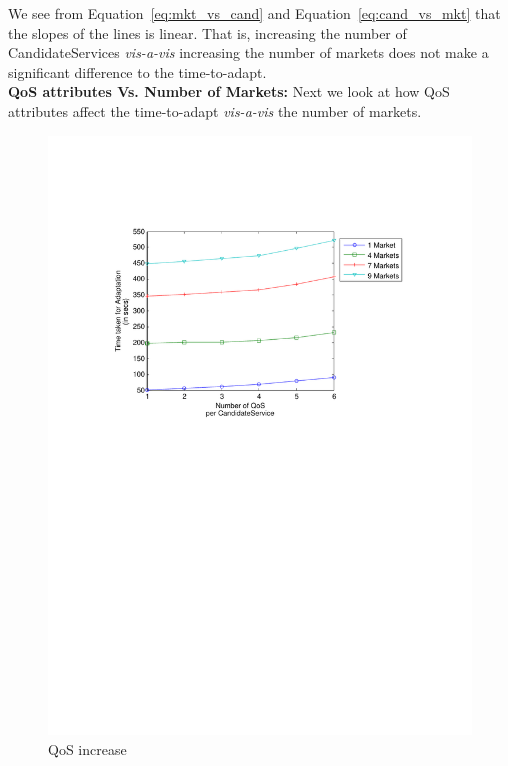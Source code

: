 \documentclass[10pt,journal,compsoc]{IEEEtran}
\begin{document}
We see from Equation~\ref{eq:mkt_vs_cand} and Equation~\ref{eq:cand_vs_mkt} that the slopes of the lines is linear. That is, increasing the number of CandidateServices \textit{vis-a-vis} increasing the number of markets does not make a significant difference to the time-to-adapt.\\

\textbf{QoS attributes Vs. Number of Markets:}
Next we look at how QoS attributes affect the time-to-adapt \textit{vis-a-vis} the number of markets. 

\begin{figure}[htbp]
\centering
  \includegraphics[clip, trim=0cm 16.2cm 2cm 4cm, scale=0.45]{graphs/1_4_7_9_mkts_per_qos.pdf}
  \caption{QoS increase\label{fig:mkt_per_qos}}		
\end{figure}
\end{document}
